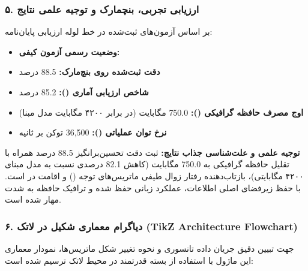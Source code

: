 \subsubsection*{۵. ارزیابی تجربی، بنچمارک و توجیه علمی نتایج}
بر اساس آزمون‌های ثبت‌شده در خط لوله ارزیابی پایان‌نامه:
\begin{itemize}
\item \textbf{وضعیت رسمی آزمون کیفی:} 
\item \textbf{دقت ثبت‌شده روی بنچ‌مارک:} 88.5 درصد
\item \textbf{شاخص ارزیابی آماری ():} 85.2 درصد
\item \textbf{اوج مصرف حافظه گرافیکی ():} 750.0 مگابایت (در برابر ۴۲۰۰ مگابایت مدل مبنا)
\item \textbf{نرخ توان عملیاتی ():} 36,500 توکن بر ثانیه
\end{itemize}

\textbf{توجیه علمی و علت‌شناسی جذاب نتایج:}
ثبت دقت تحسین‌برانگیز 88.5 درصد همراه با تقلیل حافظه گرافیکی به 750.0 مگابایت (کاهش 82.1 درصدی نسبت به مدل مبنای ۴۲۰۰ مگابایتی)، بازتاب‌دهنده رفتار زوال طیفی ماتریس‌های توجه () و اقامت در  است. با حفظ زیرفضای اصلی اطلاعات، عملکرد زبانی حفظ شده و ترافیک حافظه  به شدت مهار شده است.



\subsubsection*{۶. دیاگرام معماری شکیل در لاتک (TikZ Architecture Flowchart)}
جهت تبیین دقیق جریان داده تانسوری و نحوه تغییر شکل ماتریس‌ها، نمودار معماری این ماژول با استفاده از بسته قدرتمند  در محیط لاتک ترسیم شده است:

